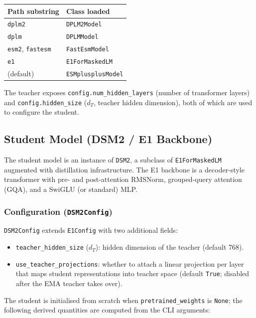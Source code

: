 \documentclass[11pt,a4paper]{article}
\begin{document}
\begin{center}
\begin{tabular}{ll}
\toprule
\textbf{Path substring} & \textbf{Class loaded} \\
\midrule
\texttt{dplm2} & \texttt{DPLM2Model} \\
\texttt{dplm}  & \texttt{DPLMModel} \\
\texttt{esm2}, \texttt{fastesm} & \texttt{FastEsmModel} \\
\texttt{e1}    & \texttt{E1ForMaskedLM} \\
(default)      & \texttt{ESMplusplusModel} \\
\bottomrule
\end{tabular}
\end{center}

The teacher exposes \texttt{config.num\_hidden\_layers} (number of transformer layers) and
\texttt{config.hidden\_size} ($d_T$, teacher hidden dimension), both of which are used to configure
the student.

\subsection{Student Model (DSM2 / E1 Backbone)}

The student model is an instance of \texttt{DSM2}, a subclass of \texttt{E1ForMaskedLM} augmented
with distillation infrastructure.  The E1 backbone is a decoder-style transformer with pre- and
post-attention RMSNorm, grouped-query attention (GQA), and a SwiGLU (or standard) MLP.

\subsubsection{Configuration (\texttt{DSM2Config})}

\texttt{DSM2Config} extends \texttt{E1Config} with two additional fields:

\begin{itemize}
  \item \texttt{teacher\_hidden\_size} ($d_T$): hidden dimension of the teacher (default 768).
  \item \texttt{use\_teacher\_projections}: whether to attach a linear projection per layer that
        maps student representations into teacher space (default \texttt{True}; disabled after the
        EMA teacher takes over).
\end{itemize}

The student is initialised from scratch when \texttt{pretrained\_weights} is \texttt{None}; the
following derived quantities are computed from the CLI arguments:
\end{document}
